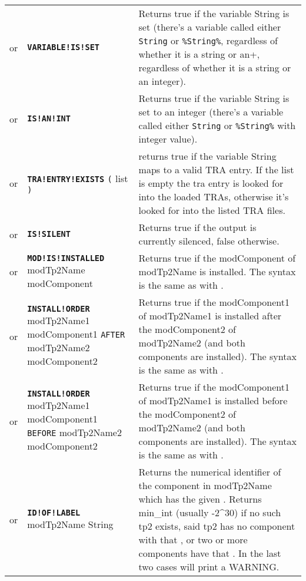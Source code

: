 \documentclass{article}
\def\ttref#1{\ahrefloc{#1}{\tt #1}}
\def\DEFINE#1{{\tt \bf #1}\label{#1}\index{#1}}
\def\DEFSYN#1{{\tt \bf #1}\index{#1}}
\def\t#1{{\tt #1}}
\def\Slist{{\color{red} list }}
\begin{document}
\begin{tabular}{cp{10in}|p{10in}}
or & \DEFINE{VARIABLE!IS!SET} \ttref{String} &
Returns true if the variable String is set (there's a variable called either
\verb+String+ or \verb+%String%+, regardless of whether it is a string or an
integer).  \\

or & \DEFSYN{IS!AN!INT} \ttref{String} &
Returns true if the variable String is set to an integer (there's a variable called either
\verb+String+ or \verb+%String%+ with integer value).  \\
or & \DEFINE{TRA!ENTRY!EXISTS} \t{(} \ttref{String} \ttref{String} \Slist \t{)} &
	returns true if the variable String maps to a valid TRA entry.
	If the \ttref{String} list is empty the tra entry is looked for into the loaded TRAs,
	otherwise it's looked for into the listed TRA files.
\\
or & \DEFSYN{IS!SILENT} &
Returns true if the output is currently silenced, false otherwise.  \\

or & \DEFINE{MOD!IS!INSTALLED} modTp2Name modComponent &
Returns true if the modComponent of modTp2Name is installed. The syntax
is the same as with \ttref {REQUIRE!COMPONENT}.  \\

or & \DEFINE{INSTALL!ORDER} modTp2Name1 modComponent1 \t{AFTER} modTp2Name2 modComponent2 &
Returns true if the modComponent1 of modTp2Name1 is installed after the modComponent2
of modTp2Name2 (and both components are installed). The syntax
is the same as with \ttref {REQUIRE!COMPONENT}.  \\

or & \DEFSYN{INSTALL!ORDER} modTp2Name1 modComponent1 \t{BEFORE} modTp2Name2 modComponent2 &
Returns true if the modComponent1 of modTp2Name1 is installed before the modComponent2
of modTp2Name2 (and both components are installed). The syntax
is the same as with \ttref {REQUIRE!COMPONENT}.  \\

or & \DEFINE{ID!OF!LABEL} modTp2Name String &
  Returns the numerical identifier of the component in modTp2Name which has
  the given \ttref{LABEL}. Returns min_int (usually -2^30) if no such tp2
  exists, said tp2 has no component with that \ttref{LABEL}, or two or more
  components have that \ttref{LABEL}. In the last two cases will print a
  WARNING. \\


\end{tabular}
\end{document}
